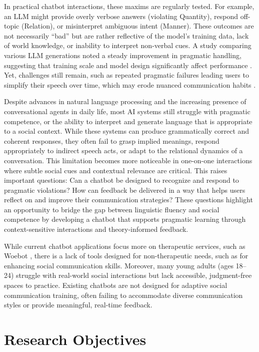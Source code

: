 In practical chatbot interactions, these maxims are regularly tested. For example, an LLM might provide overly verbose
answers (violating Quantity), respond off-topic (Relation), or misinterpret ambiguous intent (Manner). These outcomes
are not necessarily “bad” but are rather reflective of the model’s training data, lack of world knowledge, or inability
to interpret non-verbal cues. A study comparing various LLM generations noted a steady improvement in pragmatic handling,
suggesting that training scale and model design significantly affect performance \cite{bojic_gpt-4_2023}. Yet, challenges still remain,
such as repeated pragmatic failures leading users to simplify their speech over time, which may erode nuanced communication habits
\cite{eragamreddy_impact_2025}.

Despite advances in natural language processing and the increasing presence of conversational agents in daily life,
most AI systems still struggle with pragmatic competence, or the ability to interpret and generate language that
is appropriate to a social context. While these systems can produce grammatically correct and coherent responses, they
often fail to grasp implied meanings, respond appropriately to indirect speech acts, or adapt to the relational dynamics
of a conversation. This limitation becomes more noticeable in one-on-one interactions where subtle social cues and contextual
relevance are critical. This raises important questions: Can a chatbot be designed to recognize and respond to pragmatic
violations? How can feedback be delivered in a way that helps users reflect on and improve their communication strategies?
These questions highlight an opportunity to bridge the gap between linguistic fluency and social competence
by developing a chatbot that supports pragmatic learning through context-sensitive interactions and theory-informed
feedback.

While current chatbot applications focus more on therapeutic services, such as Woebot \cite{Woebot:2025}, there is a lack of tools designed for non-therapeutic 
needs, such as for enhancing social communication skills. Moreover, many young adults (ages 18–24) struggle with real-world social interactions but lack accessible, 
judgment-free spaces to practice. Existing chatbots are not designed for adaptive social communication training, often failing to accommodate diverse 
communication styles or provide meaningful, real-time feedback.

\section{Research Objectives}

